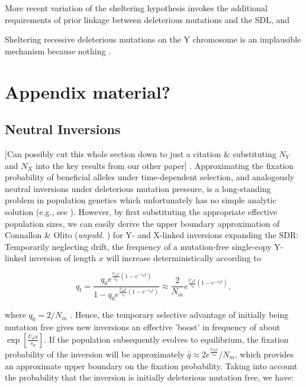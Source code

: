 \documentclass{article}
\newcommand\hl[1]{%
  \bgroup
  \hskip0pt\color{blue!80!black}%
  #1%
  \egroup
}
\begin{document}
More recent variation of the sheltering hypothesis invokes the additional requirements of prior linkage between deleterious mutations and the SDL, and 

Sheltering recessive deleterious mutations on the Y chromosome is an implausible mechanism because nothing 	 .



\section*{Appendix material?}

\subsection*{Neutral Inversions}


\hl{[Can possibly cut this whole section down to just a citation \& substituting $N_Y$ and $N_X$ into the key results from our other paper]}. Approximating the fixation probability of beneficial alleles under time-dependent selection, and analogously neutral inversions under deleterious mutation pressure, is a long-standing problem in population genetics which unfortunately has no simple analytic solution (e.g., see \citealt{OhtaKojima1968, KimuraOhta1970,UeckerHermisson2011, Waxman2011}). However, by first substituting the appropriate effective population sizes, we can easily derive the upper boundary approximation of \hl{Connallon \& Olito ({\itshape unpubl.}}) for Y- and X-linked inversions expanding the SDR: Temporarily neglecting drift, the frequency of a mutation-free single-copy Y-linked inversion of length $x$ will increase deterministically according to

\begin{equation}\label{eq:neuQT}
	q_t = \frac{q_0 e^{\frac{U_d x}{s_d}(1 - e^{-s_d t})}}{1- q_0 e^{\frac{U_d x}{s_d}(1 - e^{-s_d t})}} \approx \frac{2}{N_m} e^{\frac{U_d x}{s_d}(1 - e^{-s_d t})},
\end{equation}

\noindent where $q_0 = 2/N_m$ \citep{Nei1967}. Hence, the temporary selective advantage of initially being mutation free gives new inversions an effective 'boost' in frequency of about $\exp[\frac{U_d x}{s_d}]$. If the population subsequently evolves to equilibrium, the fixation probability of the inversion will be approximately $\hat{q} \approx 2 e^{\frac{U_d x}{s_d}}/N_m$, which provides an approximate upper boundary on the fixation probability. Taking into account the probability that the inversion is initially deleterious mutation free, we have: 
\end{document}
